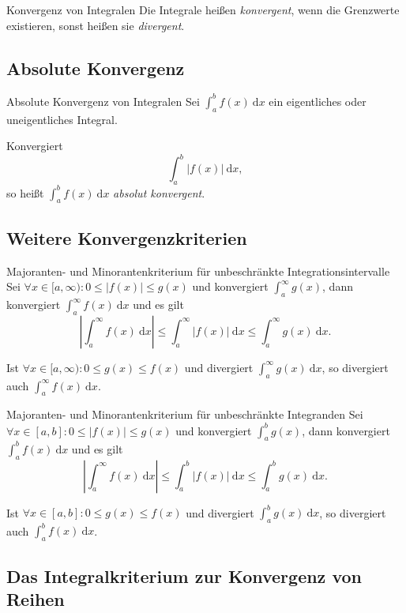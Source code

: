 \documentclass[german]{spicker}
\renewcommand{\abs}[1]{\left| #1 \right|}
\newcommand{\dx}{~\mathrm{d}x}
\begin{document}
\begin{defi}{Konvergenz von Integralen}
    Die Integrale heißen \emph{konvergent}, wenn die Grenzwerte existieren, sonst heißen sie \emph{divergent}.
\end{defi}

\subsection{Absolute Konvergenz}

\begin{defi}{Absolute Konvergenz von Integralen}
    Sei $\int^b_a f(x) \dx$ ein eigentliches oder uneigentliches Integral.

    Konvergiert
    $$
        \int^b_a \abs{f(x)} \dx,
    $$
    so heißt $\int^b_a f(x) \dx$ \emph{absolut konvergent}.
\end{defi}

\subsection{Weitere Konvergenzkriterien}

\begin{defi}{Majoranten- und Minorantenkriterium für unbeschränkte Integrationsintervalle}
    Sei $\forall x \in [a, \infty) : 0 \leq \abs{f(x)} \leq g(x)$ und konvergiert $\int^\infty_a g(x)$, dann konvergiert $\int^\infty_a f(x) \dx$ und es gilt
    $$
        \abs{\int^\infty_a f(x) \dx} \leq \int^\infty_a \abs{f(x)} \dx \leq \int^\infty_a g(x) \dx.
    $$

    Ist $\forall x\in [a, \infty) : 0\leq g(x) \leq f(x)$ und divergiert $\int^\infty_a g(x) \dx$, so divergiert auch $\int^\infty_a f(x) \dx$.
\end{defi}

\begin{defi}{Majoranten- und Minorantenkriterium für unbeschränkte Integranden}
    Sei $\forall x \in [a, b] : 0 \leq \abs{f(x)} \leq g(x)$ und konvergiert $\int^b_a g(x)$, dann konvergiert $\int^b_a f(x) \dx$ und es gilt
    $$
        \abs{\int^\infty_a f(x) \dx} \leq \int^b_a \abs{f(x)} \dx \leq \int^b_a g(x) \dx.
    $$

    Ist $\forall x\in [a, b] : 0\leq g(x) \leq f(x)$ und divergiert $\int^b_a g(x) \dx$, so divergiert auch $\int^b_a f(x) \dx$.
\end{defi}

\subsection{Das Integralkriterium zur Konvergenz von Reihen}
\end{document}
